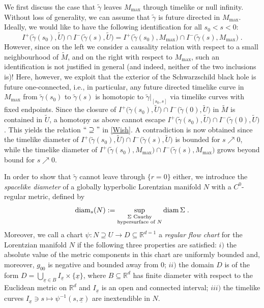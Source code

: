 \documentclass[reqno]{article}
\newcommand{\R}{\mathbb{R}}
\newcommand{\diam}{\mathrm{diam}}
\newcommand{\ux}{\underline{x}}
\newcommand{\Mmax}{M_{\mathrm{max}}}
\begin{document}
We first discuss the case that $\tilde{\gamma}$ leaves $\Mmax$ through timelike or null infinity. Without loss of generality, we can assume that $\tilde{\gamma}$ is future directed in $\Mmax$. Ideally, we would like to have the following identification for all $s_0 < s < 0$:
\begin{equation}
\label{Wish}
I^+\big(\tilde{\gamma}(s_0), \tilde{U}\big) \cap I^-\big(\tilde{\gamma}(s), \tilde{U}\big) = I^+\big(\tilde{\gamma}(s_0), \Mmax\big) \cap I^-\big(\tilde{\gamma}(s), \Mmax\big) \;.
\end{equation}
However, since on the left we consider a causality relation with respect to a small neighbourhood of $\tilde{M}$, and on the right with respect to $\Mmax$, such an identification is not justified in general (and indeed, neither of the two inclusions is)! Here, however, we exploit that the exterior of the Schwarzschild black hole is future one-connected, i.e., in particular, any future directed timelike curve in $\Mmax$ from $\tilde{\gamma}(s_0)$ to $\tilde{\gamma}(s)$ is homotopic to $\tilde{\gamma}|_{[s_0,s]}$ via timelike curves with fixed endpoints. Since the closure of $I^+\big(\tilde{\gamma}(s_0), \tilde{U}\big) \cap I^-\big(\tilde{\gamma}(0), \tilde{U}\big)$ in $\tilde{M}$ is contained in $\tilde{U}$, a homotopy as above cannot escape $I^+\big(\tilde{\gamma}(s_0), \tilde{U}\big) \cap I^-\big(\tilde{\gamma}(0), \tilde{U}\big)$. This yields the relation $``\supseteq"$ in \eqref{Wish}. A contradiction is now obtained since the timelike diameter of $I^+\big(\tilde{\gamma}(s_0), \tilde{U}\big) \cap I^-\big(\tilde{\gamma}(s), \tilde{U}\big)$ is bounded for $s \nearrow 0$, while the timelike diameter of $I^+\big(\tilde{\gamma}(s_0), \Mmax\big) \cap I^-\big(\tilde{\gamma}(s), \Mmax\big)$ grows beyond bound for $s \nearrow 0$.

In order to show that $\tilde{\gamma}$ cannot leave through $\{r=0\}$ either, we introduce the  \emph{spacelike diameter} of a globally hyperbolic  Lorentzian manifold $N$ with a $C^0$-regular metric, defined by
\begin{equation*}
\diam_s(N) := \sup_{\substack{\Sigma \textnormal{ Cauchy} \\ \textnormal{hypersurface of } N}} \diam\, \Sigma \;.
\end{equation*} 
Moreover, we call a chart $\psi : N \supseteq U \to D \subseteq \R^{d=1}$ a \emph{regular flow chart} for the Lorentzian manifold $N$ if the following three properties are satisfied: $i)$ the absolute value of the metric components in this chart are uniformly bounded and, moreover, $g_{00}$ is negative and bounded away from $0$; $ii)$ the domain $D$ is of the form $D = \bigcup_{\ux \in B} I_{\ux} \times \{\ux\}$, where $B \subseteq \R^d$ has finite diameter with respect to the Euclidean metric on $\R^d$ and $I_{\ux}$ is an open and connected interval; $iii)$ the timelike curves $I_{\ux} \ni s \mapsto \psi^{-1}(s, \ux)$ are inextendible in $N$.
\end{document}
